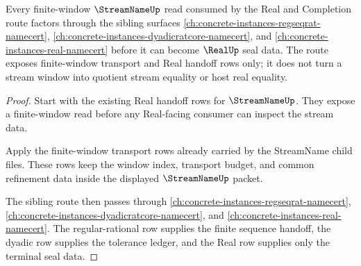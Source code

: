 \begin{theorem}
\label{thm:streamname-real-completion-sibling-route}
Every finite-window $\StreamNameUp$ read consumed by the Real and Completion route factors through the sibling surfaces \autoref{ch:concrete-instances-regseqrat-namecert}, \autoref{ch:concrete-instances-dyadicratcore-namecert}, and \autoref{ch:concrete-instances-real-namecert} before it can become $\RealUp$ seal data. The route exposes finite-window transport and Real handoff rows only; it does not turn a stream window into quotient stream equality or host real equality.
\end{theorem}
\begin{proof}
Start with the existing Real handoff rows for $\StreamNameUp$. They expose a finite-window read before any Real-facing consumer can inspect the stream data.

Apply the finite-window transport rows already carried by the StreamName child files. These rows keep the window index, transport budget, and common refinement data inside the displayed $\StreamNameUp$ packet.

The sibling route then passes through \autoref{ch:concrete-instances-regseqrat-namecert}, \autoref{ch:concrete-instances-dyadicratcore-namecert}, and \autoref{ch:concrete-instances-real-namecert}. The regular-rational row supplies the finite sequence handoff, the dyadic row supplies the tolerance ledger, and the Real row supplies only the terminal seal data.
\end{proof}
